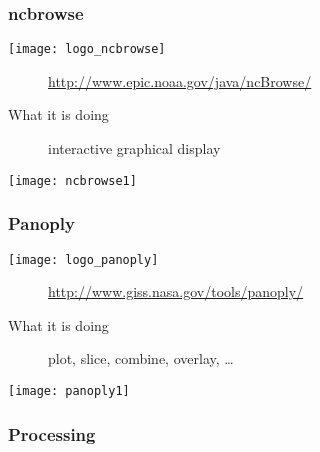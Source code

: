 \begin{frame}[c]
\frametitle{ncbrowse}

\texttt{[image: logo\_ncbrowse]}

\begin{description}
\item[\homepage] {\scriptsize \url{http://www.epic.noaa.gov/java/ncBrowse/}}
\item[What it is doing] interactive graphical display
\end{description}

\vfill

\texttt{[image: ncbrowse1]}
\end{frame}

\begin{frame}[c]
\frametitle{Panoply}

\texttt{[image: logo\_panoply]}

\begin{description}
\item[\homepage] {\scriptsize\url{http://www.giss.nasa.gov/tools/panoply/}}
\item[What it is doing] plot, slice, combine, overlay, \ldots
\end{description}

\vfill

\texttt{[image: panoply1]}

\end{frame}

\subsubsection{Processing}

